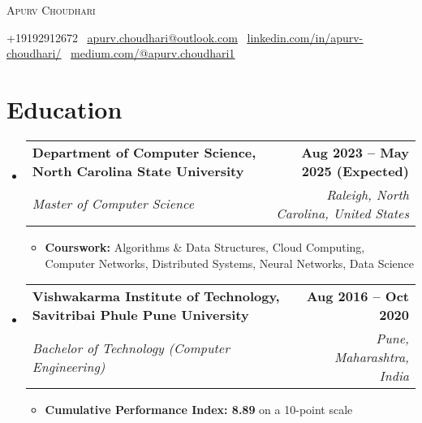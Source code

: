\documentclass[letterpaper,11pt, ]{article}
\makeatletter
\newcommand{\resumeSilentItem}[1]{
  \item\small{
    {#1 \vspace{-2pt}}
  }
}
\newcommand{\resumeSubheading}[4]{
  \vspace{-2pt}\item
    \begin{tabular*}{\textwidth}[t]{ l @{\extracolsep{\fill}} r }
      \textbf{#1} & \textbf{\small #2} \\
      \textit{\small#3} & \textit{\small #4} \\
    \end{tabular*}\vspace{-7pt}
}
\newcommand{\resumeSubHeadingListStart}{\begin{itemize}[leftmargin=0.0in, label={}]}
\newcommand{\resumeSubHeadingListEnd}{\end{itemize}}
\newcommand{\resumeItemSilentListStart}{\vspace{-4pt} \begin{itemize}[label = {}]}
\newcommand{\resumeItemSilentListEnd}{\end{itemize}\vspace{-7pt}}
\makeatother
\begin{document}
\begin{center}
    {\Huge \scshape Apurv Choudhari} \\ \vspace{1pt}

    +19192912672 \textbar\  \href{mailto:apurv.choudhari@outlook.com}{\underline{apurv.choudhari@outlook.com}} \textbar\ \href{https://www.linkedin.com/in/apurv-choudhari}{\underline{linkedin.com/in/apurv-choudhari/}} \textbar\ \href{https://medium.com/@apurv.choudhari1}{\underline{medium.com/@apurv.choudhari1}}

    \vspace{-8pt}
    
\end{center}


\section{Education}

  \resumeSubHeadingListStart

    \resumeSubheading
      {Department of Computer Science, North Carolina State University}{Aug 2023 -- May 2025 (Expected)}
      {Master of Computer Science}{Raleigh, North Carolina, United States}
      \resumeItemSilentListStart
      \resumeSilentItem{
          \textbf{Courswork:} Algorithms \& Data Structures, Cloud Computing, Computer Networks, Distributed Systems, Neural Networks,
          Data Science \newline
          }
      \resumeItemSilentListEnd
      \vspace{-1pt}  
    \resumeSubheading
        {Vishwakarma Institute of Technology, Savitribai Phule Pune University}{Aug 2016 -- Oct 2020}
        {Bachelor of Technology (Computer Engineering)}{Pune, Maharashtra, India}
    \resumeItemSilentListStart
    \resumeSilentItem{
        \textbf{Cumulative Performance Index: 8.89} on a 10-point scale \newline
        }
    \resumeItemSilentListEnd
    \vspace{-1pt}
  \resumeSubHeadingListEnd


\end{document}
